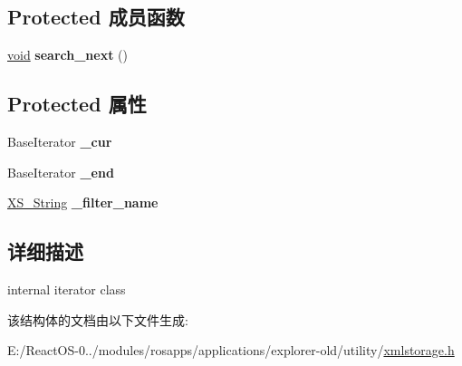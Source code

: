 \subsection*{Protected 成员函数}
\begin{DoxyCompactItemize}
\item 
\mbox{\label{struct_x_m_l_storage_1_1_x_m_l_children_filter_1_1iterator_aee64c1a2114df7eba802c38fdd2506d1}} 
\hyperlink{interfacevoid}{void} {\bfseries search\+\_\+next} ()
\end{DoxyCompactItemize}
\subsection*{Protected 属性}
\begin{DoxyCompactItemize}
\item 
\mbox{\label{struct_x_m_l_storage_1_1_x_m_l_children_filter_1_1iterator_a77005474c366b8ba4c5faa83922b5d0b}} 
Base\+Iterator {\bfseries \+\_\+cur}
\item 
\mbox{\label{struct_x_m_l_storage_1_1_x_m_l_children_filter_1_1iterator_a505c870274b315501b87044825166997}} 
Base\+Iterator {\bfseries \+\_\+end}
\item 
\mbox{\label{struct_x_m_l_storage_1_1_x_m_l_children_filter_1_1iterator_a53dd147f5501fcbc9223b0060ec53fe8}} 
\hyperlink{struct_x_m_l_storage_1_1_x_s___string}{X\+S\+\_\+\+String} {\bfseries \+\_\+filter\+\_\+name}
\end{DoxyCompactItemize}


\subsection{详细描述}
internal iterator class 

该结构体的文档由以下文件生成\+:\begin{DoxyCompactItemize}
\item 
E\+:/\+React\+O\+S-\/0../modules/rosapps/applications/explorer-\/old/utility/\hyperlink{xmlstorage_8h}{xmlstorage.\+h}\end{DoxyCompactItemize}
